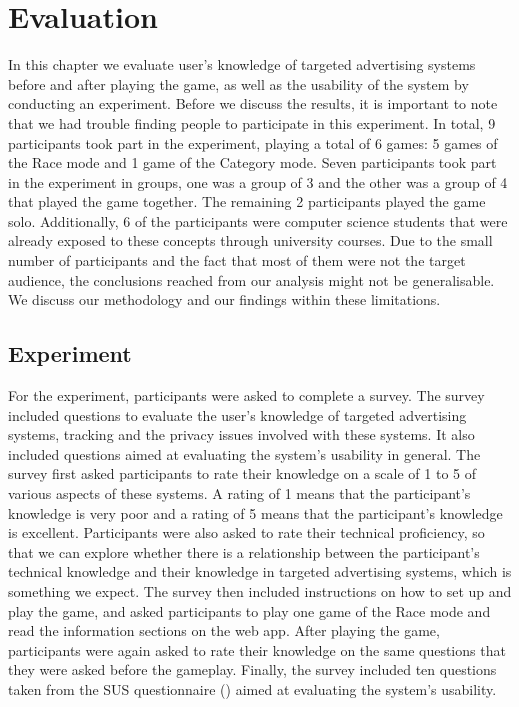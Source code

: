 \documentclass{l4proj}
\begin{document}
\chapter{Evaluation} 
In this chapter we evaluate user's knowledge of targeted advertising systems before and after playing the game, as well as the usability of the system by conducting an experiment. 
Before we discuss the results, it is important to note that we had trouble finding people to participate in this experiment. In total, 9 participants took part in the experiment, playing a total of 6 games: 5 games of the Race mode and 1 game of the Category mode. Seven participants took part in the experiment in groups, one was a group of 3 and the other was a group of 4 that played the game together. The remaining 2 participants played the game solo. Additionally, 6 of the participants were computer science students that were already exposed to these concepts through university courses. Due to the small number of participants and the fact that most of them were not the target audience, the conclusions reached from our analysis might not be generalisable. We discuss our methodology and our findings within these limitations.

\section{Experiment}
For the experiment, participants were asked to complete a survey. The survey included questions to evaluate the user's knowledge of targeted advertising systems, tracking and the privacy issues involved with these systems. It also included questions aimed at evaluating the system's usability in general. The survey first asked participants to rate their knowledge on a scale of 1 to 5 of various aspects of these systems. A rating of 1 means that the participant's knowledge is very poor and a rating of 5 means that the participant's knowledge is excellent. Participants were also asked to rate their technical proficiency, so that we can explore whether there is a relationship between the participant's technical knowledge and their knowledge in targeted advertising systems, which is something we expect. The survey then included instructions on how to set up and play the game, and asked participants to play one game of the Race mode and read the information sections on the web app. After playing the game, participants were again asked to rate their knowledge on the same questions that they were asked before the gameplay. Finally, the survey included ten questions taken from the SUS questionnaire (\cite{sus}) aimed at evaluating the system's usability.
\end{document}
